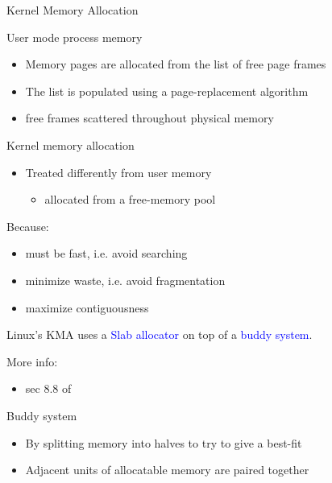 \begin{frame}{Kernel Memory Allocation}
  \begin{exampleblock}{User mode process memory}
    \begin{itemize}
    \item Memory pages are allocated from the list of free page frames
    \item The list is populated using a page-replacement algorithm
    \item free frames scattered throughout physical memory
    \end{itemize}
  \end{exampleblock}
  \begin{exampleblock}{Kernel memory allocation}
    \begin{itemize}
    \item Treated differently from user memory
      \begin{itemize}
      \item allocated from a free-memory pool
      \end{itemize}
    \end{itemize}
    Because:
    \begin{itemize}
    \item must be fast, i.e. avoid searching
    \item minimize waste, i.e. avoid fragmentation
    \item maximize contiguousness
    \end{itemize}
  \end{exampleblock}
  \begin{center}
    Linux's KMA uses a \textcolor{blue}{Slab allocator} on top of a \textcolor{blue}{buddy
      system}.
  \end{center}
\end{frame}

More info:
\begin{itemize}
\item sec 8.8 of \cite{silberschatz11essentials}
\end{itemize}

\begin{frame}
  \begin{exampleblock}{Buddy system}
    \begin{itemize}
    \item By splitting memory into halves to try to give a best-fit
    \item Adjacent units of allocatable memory are paired together
    \end{itemize}
  \end{exampleblock}
  \begin{center}
     
  \end{center}
\end{frame}

